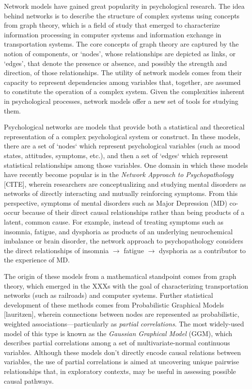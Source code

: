 Network models have gained great popularity in psychological research. The idea behind networks is to describe the structure of complex systems using concepts from graph theory, which is a field of study that emerged to characterize information processing in computer systems and information exchange in transportation systems. The core concepts of graph theory are captured by the notion of components, or ‘nodes’, whose relationships are depicted as links, or ‘edges’, that denote the presence or absence, and possibly the strength and direction, of those relationships. The utility of network models comes from their capacity to represent dependencies among variables that, together, are assumed to constitute the operation of a complex system. Given the complexities inherent in psychological processes, network models offer a new set of tools for studying them.

Psychological networks are models that provide both a statistical and theoretical representation of a complex psychological system or construct. In these models, there are a set of `nodes` which represent psychological variables (such as mood states, attitudes, symptoms, etc.), and then a set of `edges` which represent statistical relationships among those variables. One domain in which these models have recently become popular is in the \textit{Network Approach to Psychopathology} [CITE], wherein researchers are conceptualizing and studying mental disorders as networks of directly interacting and mutually reinforcing symptoms. From this perspective, symptoms of mental disorders such as Major Depression (MD) co-occur because of their direct causal relationships rather than being products of a latent, common cause. For example, instead of treating symptoms such as insomnia, fatigue, and dysphoria as products of an underlying neurochemical imbalance or brain disorder, the network approach to psychopathology considers the direct relationships of insomnia $\rightarrow$ fatigue $\rightarrow$ dysphoria as a contributor to the experience of MD. 

The origin of these models from a mathematical standpoint comes from graph theory, which emerged in the XXXs with the goal of characterizing transportation networks (such as railroads) and computer systems. Further statistical development of these methods comes from Probabilistic Graphical Models [lauritzen], wherein connections between nodes are represented as probabilistic, weighted associations---particularly as \textit{partial correlations}. The most widely-used model of this type is known as the \textit{Gaussian Graphical Model} (GGM), which describes partial correlations among a set of multivariate-normal continuous variables. Although these models don't directly encode causal relations between variables, the use of partial correlations is aimed at uncovering unique pairwise relationships that, in exploratory contexts, may be useful in assessing possible causal pathways. 

